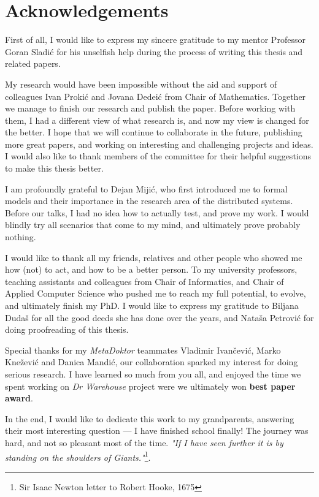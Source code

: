 \chapter*{Acknowledgements}
First of all, I would like to express my sincere gratitude to my mentor Professor Goran Sladi\'c for his unselfish help during the process of writing this thesis and related papers.

My research would have been impossible without the aid and support of colleagues Ivan Proki\'c and Jovana Dedei\'c from Chair of Mathematics. Together we manage to finish our research and publish the paper. Before working with them, I had a different view of what research is, and now my view is changed for the better. I hope that we will continue to collaborate in the future, publishing more great papers, and working on interesting and challenging projects and ideas. I would also like to thank members of the committee for their helpful suggestions to make this thesis better.

I am profoundly grateful to Dejan Miji\'c, who first introduced me to formal models and their importance in the research area of the distributed systems. Before our talks, I had no idea how to actually test, and prove my work. I would blindly try all scenarios that come to my mind, and ultimately prove probably nothing.

I would like to thank all my friends, relatives and other people who showed me how (not) to act, and how to be a better person. To my university professors, teaching assistants and colleagues from Chair of Informatics, and Chair of Applied Computer Science who pushed me to reach my full potential, to evolve, and ultimately finish my PhD. I would like to express my gratitude to Biljana Duda\v s for all the good deeds she has done over the years, and Nata\v sa Petrovi\'c for doing proofreading of this thesis. 

Special thanks for my \emph{MetaDoktor} teammates Vladimir Ivan\v cevi\'c, Marko Kne\v zevi\'c and Danica Mandi\'c, our collaboration sparked my interest for doing serious research. I have learned so much from you all, and enjoyed the time we spent working on \emph{Dr Warehouse} project were we ultimately won \textbf{best paper award}.

In the end, I would like to dedicate this work to my grandparents, answering their most interesting question --- I have finished school finally! The journey was hard, and not so pleasant most of the time. \emph{"If I have seen further it is by standing on the shoulders of Giants."}\footnote{Sir Isaac Newton letter to Robert Hooke, 1675}.
